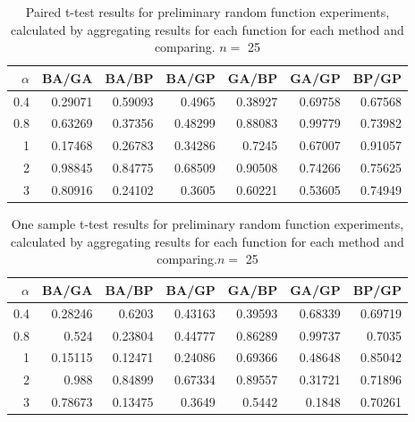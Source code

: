 \documentclass[a4paper,11pt]{article}
\begin{document}
\begin{appendices}
\begin{table}[htb]
\caption{Paired t-test results for preliminary random function experiments, calculated by aggregating results for each function for each method and comparing. $n=$ 25} 
\begin{center}
\begin{tabular}{r|rrrrrr}
 $\alpha$  &    BA/GA  &    BA/BP  &    BA/GP  &    GA/BP  &    GA/GP  &    BP/GP  \\
\hline
      0.4  &  0.29071  &  0.59093  &   0.4965  &  0.38927  &  0.69758  &  0.67568  \\
      0.8  &  0.63269  &  0.37356  &  0.48299  &  0.88083  &  0.99779  &  0.73982  \\
        1  &  0.17468  &  0.26783  &  0.34286  &   0.7245  &  0.67007  &  0.91057  \\
        2  &  0.98845  &  0.84775  &  0.68509  &  0.90508  &  0.74266  &  0.75625  \\
        3  &  0.80916  &  0.24102  &   0.3605  &  0.60221  &  0.53605  &  0.74949  \\
\end{tabular}
\end{center}
\end{table}


\begin{table}[htb]
\caption{One sample t-test results for preliminary random function experiments, calculated by aggregating results for each function for each method and comparing.$n=$ 25} 
\begin{center}
\begin{tabular}{r|rrrrrr}
 $\alpha$  &    BA/GA  &    BA/BP  &    BA/GP  &    GA/BP  &    GA/GP  &    BP/GP  \\
\hline
      0.4  &  0.28246  &   0.6203  &  0.43163  &  0.39593  &  0.68339  &  0.69719  \\
      0.8  &    0.524  &  0.23804  &  0.44777  &  0.86289  &  0.99737  &   0.7035  \\
        1  &  0.15115  &  0.12471  &  0.24086  &  0.69366  &  0.48648  &  0.85042  \\
        2  &    0.988  &  0.84899  &  0.67334  &  0.89557  &  0.31721  &  0.71896  \\
        3  &  0.78673  &  0.13475  &   0.3649  &   0.5442  &   0.1848  &  0.70261  \\
\end{tabular}
\end{center}
\end{table}

\end{appendices}
\end{document}
